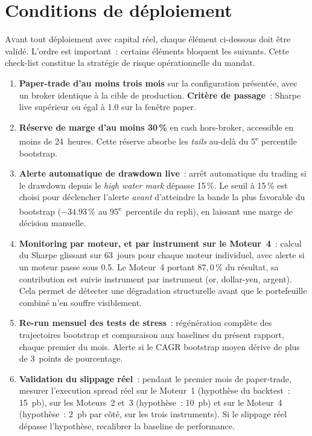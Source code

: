 \section{Conditions de déploiement}
\label{sec:production}

\lettrine[lines=2, findent=2pt, nindent=0pt]{A}{v}ant tout déploiement avec capital réel, chaque élément ci-dessous doit être validé. L'ordre est important~: certains éléments bloquent les suivants. Cette check-list constitue la stratégie de risque opérationnelle du mandat.

\begin{enumerate}[label=\color{primary}\textbf{\arabic*.}]
\item \textbf{Paper-trade d'au moins trois mois} sur la configuration présentée, avec un broker identique à la cible de production. \textbf{Critère de passage}~: Sharpe live supérieur ou égal à 1.0 sur la fenêtre paper.

\item \textbf{Réserve de marge d'au moins 30\,\%} en cash hors-broker, accessible en moins de 24~heures. Cette réserve absorbe les \emph{tails} au-delà du 5\textsuperscript{e} percentile bootstrap.

\item \textbf{Alerte automatique de drawdown live}~: arrêt automatique du trading si le drawdown depuis le \emph{high water mark} dépasse 15\,\%. Le seuil à 15\,\% est choisi pour déclencher l'alerte \emph{avant} d'atteindre la bande la plus favorable du bootstrap ($-34.93\,\%$ au 95\textsuperscript{e}~percentile du repli), en laissant une marge de décision manuelle.

\item \textbf{Monitoring par moteur, et par instrument sur le Moteur~4}~: calcul du Sharpe glissant sur 63~jours pour chaque moteur individuel, avec alerte si un moteur passe sous 0.5. Le Moteur~4 portant $87{,}0\,\%$ du résultat, sa contribution est suivie instrument par instrument (or, dollar-yen, argent). Cela permet de détecter une dégradation structurelle avant que le portefeuille combiné n'en souffre visiblement.

\item \textbf{Re-run mensuel des tests de stress}~: régénération complète des trajectoires bootstrap et comparaison aux baselines du présent rapport, chaque premier du mois. Alerte si le CAGR bootstrap moyen dérive de plus de 3~points de pourcentage.

\item \textbf{Validation du slippage réel}~: pendant le premier mois de paper-trade, mesurer l'execution spread réel sur le Moteur~1 (hypothèse du backtest~: 15~pb), sur les Moteurs~2 et~3 (hypothèse~: 10~pb) et sur le Moteur~4 (hypothèse~: 2~pb par côté, sur les trois instruments). Si le slippage réel dépasse l'hypothèse, recalibrer la baseline de performance.


\end{enumerate}
